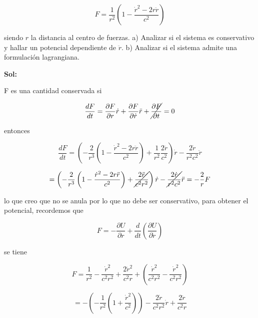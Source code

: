 \documentclass[12pt,a4paper]{article}
\begin{document}
\begin{enumerate}
    \begin{equation*}
        F = \frac{1}{r^2} \left(1 - \frac{\dot{r}^2 - 2 r \ddot{r}}{c^2}\right)
    \end{equation*}
    
    siendo $r$ la distancia al centro de fuerzas. a) Analizar si el sistema es conservativo y hallar un potencial dependiente de $\ddot{r}$. b) Analizar si el sistema admite una formulación lagrangiana.
    
    \textbf{Sol:}
    
    F es una cantidad conservada si
    
    \begin{equation*}
        \frac{d F}{dt} = \frac{\partial F}{\partial r} \dot{r} + \frac{\partial F}{ \partial \dot{r}} \ddot{r} +\cancel{ \frac{\partial F}{\partial t} }= 0
    \end{equation*}
    
    entonces
    
    \begin{equation*}
        \frac{d F}{dt} = \left(-\frac{2}{r^3} \left(1 - \frac{\dot{r}^2 - 2r \ddot{r}}{c^2}\right) + \frac{1}{r^2} \frac{2\ddot{r}}{c^2}\right) \dot{r} - \frac{2 \dot{r}}{r^2 c^2} \ddot{r}
    \end{equation*}
    
    \begin{equation*}
        = \left(-\frac{2}{r^3} \left(1 - \frac{\dot{r}^2 - 2r \ddot{r}}{c^2}\right) + \cancel{\frac{2\ddot{r}}{c^2r^2}}\right) \dot{r} -\cancel{ \frac{2 \dot{r}}{r^2 c^2}} \ddot{r} = - \frac{2}{r} F
    \end{equation*}
    
    lo que creo que no se anula por lo que no debe ser conservativo, para obtener el potencial, recordemos que
    
    \begin{equation*}
        F= - \frac{\partial U}{\partial r} + \frac{d}{dt} \left(\frac{\partial U}{\partial \dot{r}}\right)
    \end{equation*}
    
    se tiene
    
    \begin{equation*}
        F =  \frac{1}{r^2} - \frac{\dot{r}^2}{c^2 r^2 } + \frac{2\ddot{r}^2}{c^2 r} +\left(\frac{\dot{r}^2}{c^2 r^2} - \frac{\dot{r}^2}{c^2 r^2}\right)
    \end{equation*}
    
    \begin{equation*}
        = -\left(-\frac{1}{r^2} \left( 1 + \frac{\dot{r}^2}{c^2}\right) \right) - \frac{2 \dot{r}}{c^2 r^2} \dot{r}+ \frac{2 \ddot{r}}{c^2 r} 
    \end{equation*}
    

\end{enumerate}
\end{document}
